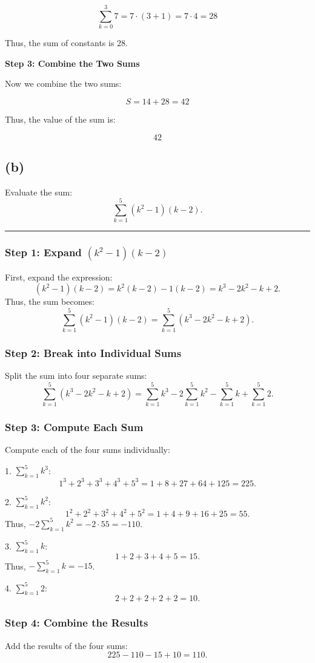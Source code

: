 \documentclass{article}
\newcommand{\HRule}[1]{\rule{\linewidth}{#1}}
\begin{document}
\[
\sum_{k=0}^3 7 = 7 \cdot (3 + 1) = 7 \cdot 4 = 28
\]

Thus, the sum of constants is \( 28 \).

\textbf{Step 3: Combine the Two Sums}

Now we combine the two sums:

\[
S = 14 + 28 = 42
\]

Thus, the value of the sum is:

\[
\boxed{42}
\]
\subsection*{(b)}

Evaluate the sum:
\[
\sum_{k=1}^5 (k^2 - 1)(k - 2).
\]
\HRule{0.5pt}
\subsubsection*{Step 1: Expand \((k^2 - 1)(k - 2)\)}
First, expand the expression:
\[
(k^2 - 1)(k - 2) = k^2(k - 2) - 1(k - 2) = k^3 - 2k^2 - k + 2.
\]
Thus, the sum becomes:
\[
\sum_{k=1}^5 (k^2 - 1)(k - 2) = \sum_{k=1}^5 (k^3 - 2k^2 - k + 2).
\]

\subsubsection*{Step 2: Break into Individual Sums}
Split the sum into four separate sums:
\[
\sum_{k=1}^5 (k^3 - 2k^2 - k + 2) = \sum_{k=1}^5 k^3 - 2 \sum_{k=1}^5 k^2 - \sum_{k=1}^5 k + \sum_{k=1}^5 2.
\]

\subsubsection*{Step 3: Compute Each Sum}
Compute each of the four sums individually:

1. \(\sum_{k=1}^5 k^3\):
   \[
   1^3 + 2^3 + 3^3 + 4^3 + 5^3 = 1 + 8 + 27 + 64 + 125 = 225.
   \]

2. \(\sum_{k=1}^5 k^2\):
   \[
   1^2 + 2^2 + 3^2 + 4^2 + 5^2 = 1 + 4 + 9 + 16 + 25 = 55.
   \]
   Thus, \(-2 \sum_{k=1}^5 k^2 = -2 \cdot 55 = -110\).

3. \(\sum_{k=1}^5 k\):
   \[
   1 + 2 + 3 + 4 + 5 = 15.
   \]
   Thus, \(-\sum_{k=1}^5 k = -15\).

4. \(\sum_{k=1}^5 2\):
   \[
   2 + 2 + 2 + 2 + 2 = 10.
   \]

\subsubsection*{Step 4: Combine the Results}
Add the results of the four sums:
\[
225 - 110 - 15 + 10 = 110.
\]
\end{document}
